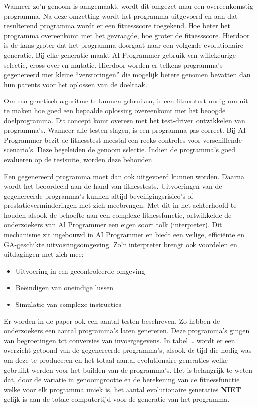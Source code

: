 Wanneer zo’n genoom is aangemaakt, wordt dit omgezet naar een overeenkomstig programma. Na deze omzetting wordt het programma uitgevoerd en aan dat resulterend programma wordt er een fitnessscore toegekend. Hoe beter het programma overeenkomt met het gevraagde, hoe groter de fitnessscore. Hierdoor is de kans groter dat het programma doorgaat naar een volgende evolutionaire generatie. Bij elke generatie maakt AI Programmer gebruik van willekeurige selectie, cross-over en mutatie. Hierdoor worden er telkens programma’s gegenereerd met kleine “verstoringen” die mogelijk betere genomen bevatten dan hun parents voor het oplossen van de doeltaak.

Om een genetisch algoritme te kunnen gebruiken, is een fitnesstest nodig om uit te maken hoe  goed een bepaalde oplossing overeenkomt met het beoogde doelprogramma. Dit concept komt overeen met het test-driven ontwikkelen van programma’s. Wanneer alle testen slagen, is een programma pas correct. Bij AI Programmer bezit de fitnesstest meestal een reeks controles voor verschillende scenario’s. Deze begeleiden de genoom selectie. Indien de programma’s goed evalueren op de testsuite, worden deze behouden.

Een gegenereerd programma moet dan ook uitgevoerd kunnen worden. Daarna wordt het beoordeeld aan de hand van fitnesstests. Uitvoeringen van de gegenereerde programma’s kunnen altijd beveiligingsrisico’s of prestatieverminderingen met zich meebrengen. Met dit in het achterhoofd te houden alsook de behoefte aan een complexe fitnessfunctie, ontwikkelde de onderzoekers van AI Programmer een eigen soort tolk (interpreter). Dit mechanisme zit ingebouwd in AI Programmer en biedt een veilige, efficiënte en GA-geschikte uitvoeringsomgeving. Zo’n interpreter brengt ook voordelen en uitdagingen met zich mee:
\begin{itemize}
	\item Uitvoering in een gecontroleerde omgeving
	\item Beëindigen van oneindige lussen
	\item Simulatie van complexe instructies
\end{itemize}

Er worden in de paper ook een aantal testen beschreven. Zo hebben de onderzoekers een aantal programma’s laten genereren. Deze programma’s gingen van begroetingen tot conversies van invoergegevens. In tabel … wordt er een overzicht getoond van de gegenereerde programma’s, alsook de tijd die nodig was om deze te produceren en het totaal aantal evolutionaire generaties welke gebruikt werden voor het builden van de programma’s. Het is belangrijk te weten dat, door de variatie in genoomgrootte en de berekening van de fitnessfunctie welke voor elk programma uniek is, het aantal evolutionaire generaties \textbf{NIET} gelijk is aan de totale computertijd voor de generatie van het programma.

